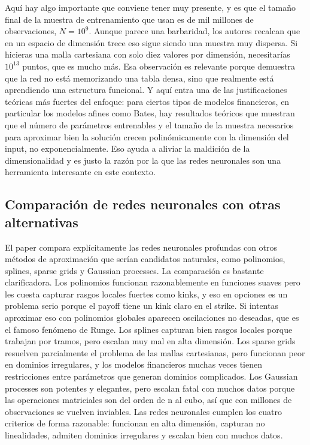 \documentclass[11pt,a4paper]{article}
\begin{document}
Aquí hay algo importante que conviene tener muy presente, y es que el tamaño final de la muestra de entrenamiento que usan es de mil millones de observaciones, $N = 10^9$. Aunque parece una barbaridad, los autores recalcan que en un espacio de dimensión trece eso sigue siendo una muestra muy dispersa. Si hicieras una malla cartesiana con solo diez valores por dimensión, necesitarías $10^{13}$ puntos, que es mucho más. Esa observación es relevante porque demuestra que la red no está memorizando una tabla densa, sino que realmente está aprendiendo una estructura funcional. Y aquí entra una de las justificaciones teóricas más fuertes del enfoque: para ciertos tipos de modelos financieros, en particular los modelos afines como Bates, hay resultados teóricos que muestran que el número de parámetros entrenables y el tamaño de la muestra necesarios para aproximar bien la solución crecen polinómicamente con la dimensión del input, no exponencialmente. Eso ayuda a aliviar la maldición de la dimensionalidad y es justo la razón por la que las redes neuronales son una herramienta interesante en este contexto.

\subsection{Comparación de redes neuronales con otras alternativas}

El paper compara explícitamente las redes neuronales profundas con otros métodos de aproximación que serían candidatos naturales, como polinomios, splines, sparse grids y Gaussian processes. La comparación es bastante clarificadora. Los polinomios funcionan razonablemente en funciones suaves pero les cuesta capturar rasgos locales fuertes como kinks, y eso en opciones es un problema serio porque el payoff tiene un kink claro en el strike. Si intentas aproximar eso con polinomios globales aparecen oscilaciones no deseadas, que es el famoso fenómeno de Runge. Los splines capturan bien rasgos locales porque trabajan por tramos, pero escalan muy mal en alta dimensión. Los sparse grids resuelven parcialmente el problema de las mallas cartesianas, pero funcionan peor en dominios irregulares, y los modelos financieros muchas veces tienen restricciones entre parámetros que generan dominios complicados. Los Gaussian processes son potentes y elegantes, pero escalan fatal con muchos datos porque las operaciones matriciales son del orden de n al cubo, así que con millones de observaciones se vuelven inviables. Las redes neuronales cumplen los cuatro criterios de forma razonable: funcionan en alta dimensión, capturan no linealidades, admiten dominios irregulares y escalan bien con muchos datos.
\end{document}
